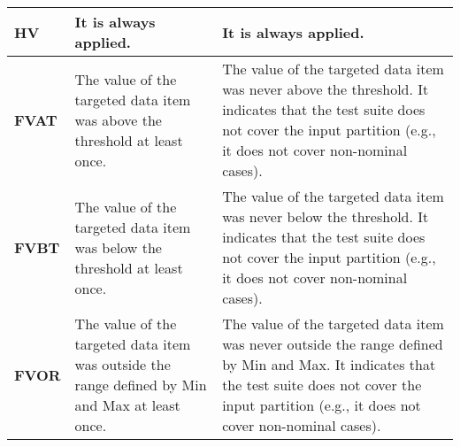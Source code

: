 \begin{table}[H]
\begin{tabular}{|p{2cm}|p{6cm}|p{6cm}|}
\textbf{HV} & It is always applied.& It is always applied.\\ \hline
\textbf{FVAT} & The value of the targeted data item was above the threshold at least once. &
The value of the targeted data item was never above the threshold. It indicates that the test suite does not cover the input partition (e.g., it does not cover non-nominal cases).\\ \hline
\textbf{FVBT} & The value of the targeted data item was below the threshold at least once. & The value of the targeted data item was never below the threshold. It indicates that the test suite does not cover the input partition (e.g., it does not cover non-nominal cases).\\ \hline
\textbf{FVOR} & The value of the targeted data item was outside the range defined by Min and Max at least once. & The value of the targeted data item was never outside the range defined by Min and Max. It indicates that the test suite does not cover the input partition (e.g., it does not cover non-nominal cases). \\ \hline
\end{tabular}
\end{table}
